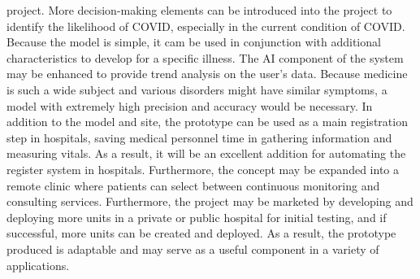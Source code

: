\documentclass{bmcart}
\begin{document}
project. More decision-making elements can be introduced into the project to
identify the likelihood of COVID, especially in the current condition of COVID.
Because the model is simple, it cam be used in conjunction with additional
characteristics to develop for a specific illness. The AI component of the
system may be enhanced to provide trend analysis on the user's data. Because
medicine is such a wide subject and various disorders might have similar
symptoms, a model with extremely high precision and accuracy would be necessary.
In addition to the model and  site, the prototype can be used as a main
registration step in hospitals, saving medical personnel time in gathering
information and measuring vitals. As a result, it will be an excellent addition
for automating the register system in hospitals. Furthermore, the concept may be
expanded into a remote clinic where patients can select between continuous
monitoring and consulting services. Furthermore, the project may be marketed by
developing and deploying more units in a private or public hospital for initial
testing, and if successful, more units can be created and deployed. As a result,
the prototype produced is adaptable and may serve as a useful component in a
variety of applications.

\end{document}
